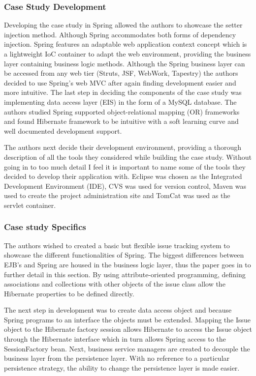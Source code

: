 														\subsubsection{Case Study Development}
														Developing the case study in Spring allowed the authors to showcase the setter injection method. Although Spring accommodates both forms of dependency injection. Spring features an adaptable web application context concept which is a lightweight IoC container to adapt the web environment, providing the business layer containing business logic methods. Although the Spring business layer can be accessed from any web tier (Struts, JSF, WebWork, Tapestry) the authors decided to use Spring’s web MVC after again finding development easier and more intuitive. The last step in deciding the components of the case study was implementing data access layer (EIS) in the form of a MySQL database. The authors studied Spring supported object-relational mapping (OR) frameworks and found Hibernate framework to be intuitive with a soft learning curve and well documented development support.
														
														The authors next decide their development environment, providing a thorough description of all the tools they considered while building the case study. Without going in to too much detail I feel it is important to name some of the tools they decided to develop their application with. Eclipse was chosen as the Integrated Development Environment (IDE), CVS was used for version control, Maven was used to create the project administration site and TomCat was used as the servlet container.
														
														\subsubsection{Case study Specifics}
														The authors wished to created a basic but flexible issue tracking system to showcase the different functionalities of Spring. The biggest differences between EJB’s and Spring are housed in the business logic layer, thus the paper goes in to further detail in this section. By using attribute-oriented programming, defining associations and collections with other objects of the issue class allow the Hibernate properties to be defined directly. 
														
														The next step in development was to create data access object and because Spring programs to an interface the objects must be extended. Mapping the Issue object to the Hibernate factory session allows Hibernate to access the Issue object through the Hibernate interface which in turn allows Spring access to the SessionFactory bean. Next, business service managers are created to decouple the business layer from the persistence layer. With no reference to a particular persistence strategy, the ability to change the persistence layer is made easier.
														
